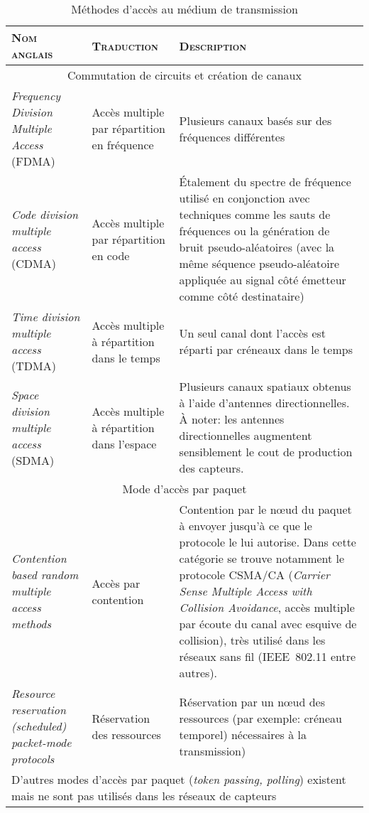 \begin{table}[!ht]
    \caption{Méthodes d'accès au médium de transmission}\label{ea:tab:mac}
    \centering
    \medskip
    \begin{small}
        \begin{tabular}{m{}|m{}|m{}}
            \toprule
            \textsc{Nom anglais} & \textsc{Traduction} & \textsc{Description}\\
            \midrule
            \multicolumn{3}{c}{Commutation de circuits et création de canaux}\\
            \midrule
            \textit{Frequency Division Multiple Access} (FDMA) & Accès multiple par répartition en fréquence & Plusieurs canaux basés sur des fréquences différentes\\
            \midrule
            \textit{Code division multiple access} (CDMA) & Accès multiple par répartition en code & Étalement du spectre de fréquence utilisé en conjonction avec techniques comme les sauts de fréquences ou la génération de bruit pseudo-aléatoires (avec la même séquence pseudo-aléatoire appliquée au signal côté émetteur comme côté destinataire)\\
            \midrule
            \textit{Time division multiple access} (TDMA) & Accès multiple à répartition dans le temps & Un seul canal dont l'accès est réparti par créneaux dans le temps\\
            \midrule
            \textit{Space division multiple access} (SDMA) & Accès multiple à répartition dans l'espace & Plusieurs canaux spatiaux obtenus à l'aide d'antennes directionnelles. À noter: les antennes directionnelles augmentent sensiblement le cout de production des capteurs.\\
            \midrule
            \multicolumn{3}{c}{Mode d'accès par paquet}\\
            \midrule
            \textit{Contention based random multiple access methods} & Accès par contention & Contention par le nœud du paquet à envoyer jusqu'à ce que le protocole le lui autorise. Dans cette catégorie se trouve notamment le protocole CSMA/CA (\textit{Carrier Sense Multiple Access with Collision Avoidance}, accès multiple par écoute du canal avec esquive de collision), très utilisé dans les réseaux sans fil (IEEE~802.11 entre autres).\\
            \midrule
            \textit{Resource reservation (scheduled) packet-mode protocols} & Réservation des ressources & Réservation par un nœud des ressources (par exemple: créneau temporel) nécessaires à la transmission)\\
            \midrule
            \multicolumn{3}{p{.95\textwidth}}{D'autres modes d'accès par paquet (\textit{token passing, polling}) existent mais ne sont pas utilisés dans les réseaux de capteurs}\\
            \bottomrule
         \end{tabular}
     \end{small}
\end{table}

